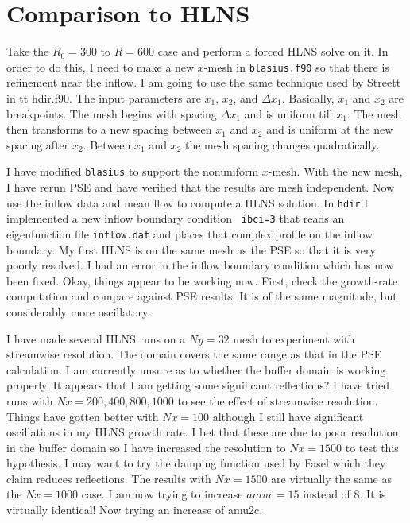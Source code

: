 \documentclass[12pt]{article}
\begin{document}
\section{Comparison to HLNS}

Take the $R_0=300$ to $R=600$ case and perform a forced HLNS solve on it.  In
order to do this, I need to make a new $x$-mesh in {\tt blasius.f90} so that
there is refinement near the inflow.  I am going to use the same technique
used by Streett in {tt hdir.f90}.  The input parameters are $x_1$, $x_2$, and
$\Delta x_1$.  Basically, $x_1$ and $x_2$ are breakpoints.  The mesh begins
with spacing $\Delta x_1$ and is uniform till $x_1$.  The mesh then transforms
to a new spacing between $x_1$ and $x_2$ and is uniform at the new spacing
after $x_2$.  Between $x_1$ and $x_2$ the mesh spacing changes quadratically.

I have modified {\tt blasius} to support the nonuniform $x$-mesh.  With the
new mesh, I have rerun PSE and have verified that the results are mesh
independent.  Now use the inflow data and mean flow to compute a HLNS
solution.  In {\tt hdir} I implemented a new inflow boundary condition {\tt
ibci=3} that reads an eigenfunction file {\tt inflow.dat} and places that
complex profile on the inflow boundary.  My first HLNS is on the same mesh as
the PSE so that it is very poorly resolved.  I had an error in the inflow
boundary condition which has now been fixed.  Okay, things appear to be
working now.  First, check the growth-rate computation and compare against PSE
results.  It is of the same magnitude, but considerably more oscillatory.  

I have made several HLNS runs on a $Ny=32$ mesh to experiment with streamwise
resolution.  The domain covers the same range as that in the PSE
calculation. I am currently unsure as to whether the buffer domain is working
properly.  It appears that I am getting some significant reflections?  I have
tried runs with $Nx=200,400,800,1000$ to see the effect of streamwise
resolution.  Things have gotten better with $Nx=100$ although I still have
significant oscillations in my HLNS growth rate.  I bet that these are due to
poor resolution in the buffer domain so I have increased the resolution to
$Nx=1500$ to test this hypothesis.  I may want to try the damping function
used by Fasel which they claim reduces reflections.  The results with
$Nx=1500$ are virtually the same as the $Nx=1000$ case.  I am now trying to
increase $amuc = 15$ instead of 8.  It is virtually identical!  Now trying an
increase of amu2c.
\end{document}
